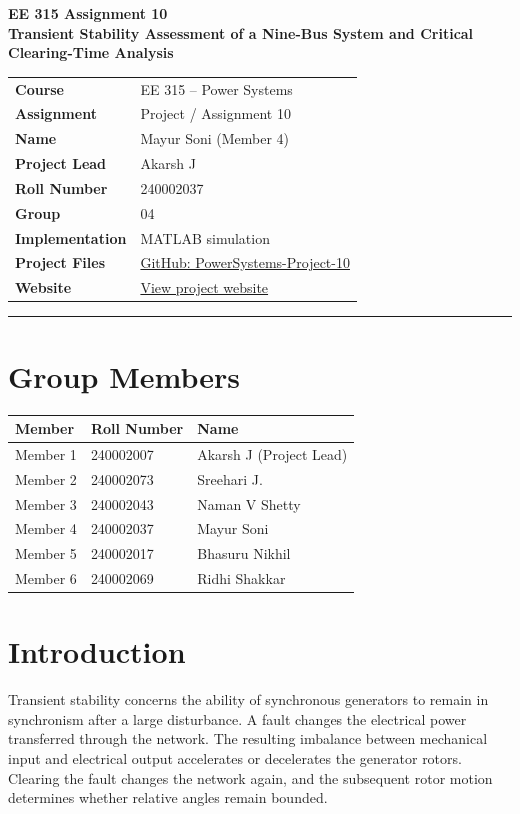\documentclass[11pt,a4paper]{article}
\begin{document}
\begin{center}\large\textbf{EE 315 Assignment 10}\\[5pt]\Large\textbf{Transient Stability Assessment of a Nine-Bus System and Critical Clearing-Time Analysis}\end{center}
\begin{tabular}{ll}
\textbf{Course}&EE 315 -- Power Systems\\
\textbf{Assignment}&Project / Assignment 10\\
\textbf{Name}&Mayur Soni (Member 4)\\
\textbf{Project Lead}&Akarsh J\\
\textbf{Roll Number}&240002037\\
\textbf{Group}&04\\
\textbf{Implementation}&MATLAB simulation\\
\textbf{Project Files}&\href{https://github.com/pacificblaster1708/PowerSystems-Project-10}{GitHub: PowerSystems-Project-10}\\
\textbf{Website}&\href{https://pacificblaster1708.github.io/PowerSystems-Project-10/}{View project website}
\end{tabular}
\vspace{10pt}\hrule
\section{Group Members}
\begin{center}\begin{tabular}{lll}\toprule Member&Roll Number&Name\\\midrule
Member 1&240002007&Akarsh J (Project Lead)\\
Member 2&240002073&Sreehari J.\\
Member 3&240002043&Naman V Shetty\\
Member 4&240002037&Mayur Soni\\
Member 5&240002017&Bhasuru Nikhil\\
Member 6&240002069&Ridhi Shakkar\\\bottomrule\end{tabular}\end{center}
\section{Introduction}
Transient stability concerns the ability of synchronous generators to remain in synchronism after a large disturbance. A fault changes the electrical power transferred through the network. The resulting imbalance between mechanical input and electrical output accelerates or decelerates the generator rotors. Clearing the fault changes the network again, and the subsequent rotor motion determines whether relative angles remain bounded.
\end{document}
